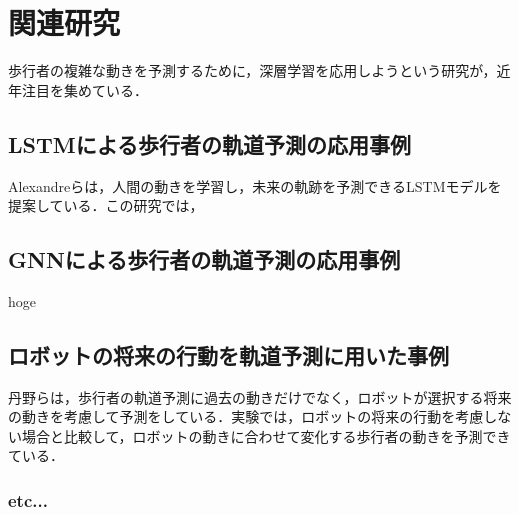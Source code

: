 
\section{関連研究}
歩行者の複雑な動きを予測するために，深層学習を応用しようという研究が，近年注目を集めている．

\subsection{LSTMによる歩行者の軌道予測の応用事例}
Alexandreらは，人間の動きを学習し，未来の軌跡を予測できるLSTMモデルを提案している．この研究では，

\subsection{GNNによる歩行者の軌道予測の応用事例}
hoge

\subsection{ロボットの将来の行動を軌道予測に用いた事例}
丹野らは，歩行者の軌道予測に過去の動きだけでなく，ロボットが選択する将来の動きを考慮して予測をしている．実験では，ロボットの将来の行動を考慮しない場合と比較して，ロボットの動きに合わせて変化する歩行者の動きを予測できている．

\subsubsection{etc...}
\newpage
